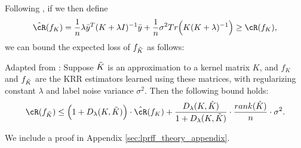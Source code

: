 
Following \citet{avron17}, if we then define 
$$\hcR(f_K) = \frac{1}{n}\lambda \by^T(K+\lambda I)^{-1}\by + \frac{1}{n}\sigma^2 Tr\Big(K(K+\lambda)^{-1}\Big) \geq \cR(f_K),$$ 
we can bound the expected loss of $f_{\tilde{K}}$ as follows:

\begin{proposition}{Adapted from \citep{avron17}:}
	\label{prop:avron}
	Suppose $\tilde{K}$ is an approximation to a kernel matrix $K$, and $f_{K}$ and $f_{\tilde{K}}$ are the KRR estimators learned using these matrices, with regularizing constant $\lambda$ and label noise variance $\sigma^2$. Then the following bound holds:
	\begin{eqnarray}
	\cR(f_{\tK}) \leq \Big(1+D_{\lambda}(K,\tK)\Big)\cdot \hcR(f_K) + \frac{D_{\lambda}(K,\tK)}{1+D_{\lambda}(K,\tK)}\cdot \frac{rank(\tK)}{n}\cdot\sigma^2.
	\end{eqnarray}
\end{proposition}
We include a proof in Appendix \ref{sec:lprff_theory_appendix}. 

